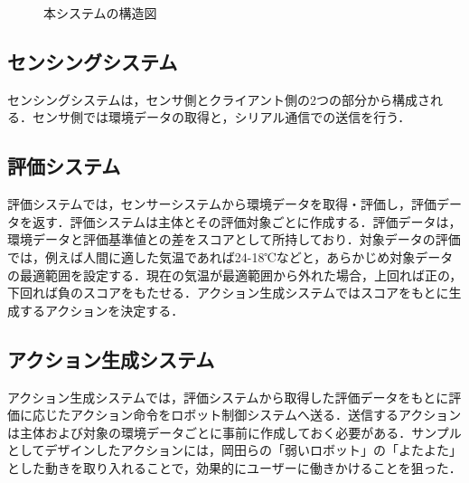 \documentclass[paper=a4paper,jafontsize=9pt,head_space=15mm,gutter=20mm,
twocolumn,number_of_lines=49, line_length=26zw]{myuarticle}
\begin{document}
\fboxsep=0pt            %
\fboxrule=1pt            %
\begin{figure}[h]
  \centering
  \caption{本システムの構造図}
  \label{fig:system-structure}
\end{figure}

\subsection{センシングシステム}

センシングシステムは，センサ側とクライアント側の2つの部分から構成される．センサ側では環境データの取得と，シリアル通信での送信を行う．

\subsection{評価システム}
評価システムでは，センサーシステムから環境データを取得・評価し，評価データを返す．評価システムは主体とその評価対象ごとに作成する．評価データは，環境データと評価基準値との差をスコアとして所持しており．対象データの評価では，例えば人間に適した気温であれば24-18℃などと，あらかじめ対象データの最適範囲を設定する．現在の気温が最適範囲から外れた場合，上回れば正の，下回れば負のスコアをもたせる．アクション生成システムではスコアをもとに生成するアクションを決定する．

\subsection{アクション生成システム}
アクション生成システムでは，評価システムから取得した評価データをもとに評価に応じたアクション命令をロボット制御システムへ送る．送信するアクションは主体および対象の環境データごとに事前に作成しておく必要がある．サンプルとしてデザインしたアクションには，岡田ら\cite{岡田-2017-弱いロボ}の「弱いロボット」の「よたよた」とした動きを取り入れることで，効果的にユーザーに働きかけることを狙った．
\end{document}
